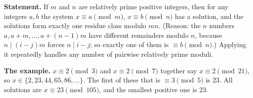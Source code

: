 \textbf{Statement.} If $m$ and $n$ are relatively prime positive integers, then for any integers $a,b$ the system $x\equiv a\pmod m$, $x\equiv b\pmod n$ has a solution, and the solutions form exactly one residue class modulo $mn$. (Reason: the $n$ numbers $a,a+m,\dots,a+(n-1)m$ have different remainders modulo $n$, because $n\mid(i-j)m$ forces $n\mid i-j$; so exactly one of them is $\equiv b\pmod n$.) Applying it repeatedly handles any number of pairwise relatively prime moduli.

\textbf{The example.} $x\equiv2\pmod3$ and $x\equiv2\pmod7$ together say $x\equiv2\pmod{21}$, so $x\in\{2,23,44,65,86,\dots\}$. The first of these that is $\equiv3\pmod5$ is $23$. All solutions are $x\equiv23\pmod{105}$, and the smallest positive one is $\boxed{23}$.

